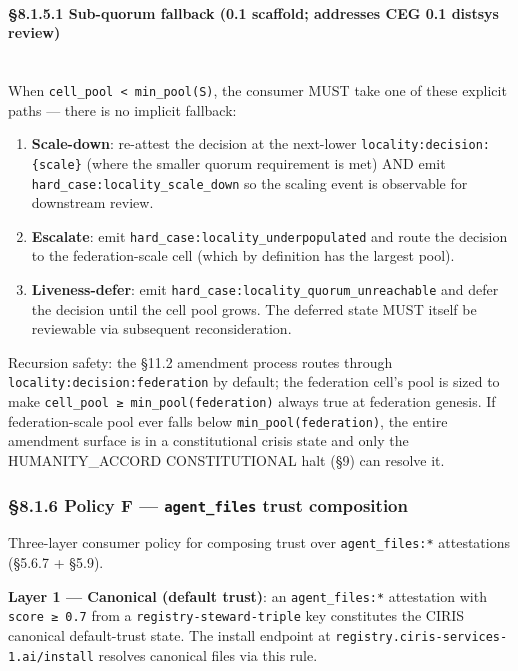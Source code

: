 \documentclass[11pt]{article}
\begin{document}
\paragraph{§8.1.5.1 Sub-quorum fallback (0.1 scaffold; addresses CEG 0.1 distsys review)}\mbox{}\\


When \texttt{cell\_pool < min\_pool(S)}, the consumer MUST take one of these explicit paths — there is no implicit fallback:


\begin{enumerate}\setlength\itemsep{0pt}
\item \textbf{Scale-down}: re-attest the decision at the next-lower \texttt{locality:decision:\{scale\}} (where the smaller quorum requirement is met) AND emit \texttt{hard\_case:locality\_scale\_down} so the scaling event is observable for downstream review.
\item \textbf{Escalate}: emit \texttt{hard\_case:locality\_underpopulated} and route the decision to the federation-scale cell (which by definition has the largest pool).
\item \textbf{Liveness-defer}: emit \texttt{hard\_case:locality\_quorum\_unreachable} and defer the decision until the cell pool grows. The deferred state MUST itself be reviewable via subsequent reconsideration.
\end{enumerate}


Recursion safety: the §11.2 amendment process routes through \texttt{locality:decision:federation} by default; the federation cell's pool is sized to make \texttt{cell\_pool ≥ min\_pool(federation)} always true at federation genesis. If federation-scale pool ever falls below \texttt{min\_pool(federation)}, the entire amendment surface is in a constitutional crisis state and only the HUMANITY\_ACCORD CONSTITUTIONAL halt (§9) can resolve it.


\subsubsection*{§8.1.6 Policy F — \texttt{agent\_files} trust composition}


Three-layer consumer policy for composing trust over \texttt{agent\_files:*} attestations (§5.6.7 + §5.9).


\textbf{Layer 1 — Canonical (default trust)}: an \texttt{agent\_files:*} attestation with \texttt{score ≥ 0.7} from a \texttt{registry-steward-triple} key constitutes the CIRIS canonical default-trust state. The install endpoint at \texttt{registry.ciris-services-1.ai/install} resolves canonical files via this rule.
\end{document}
